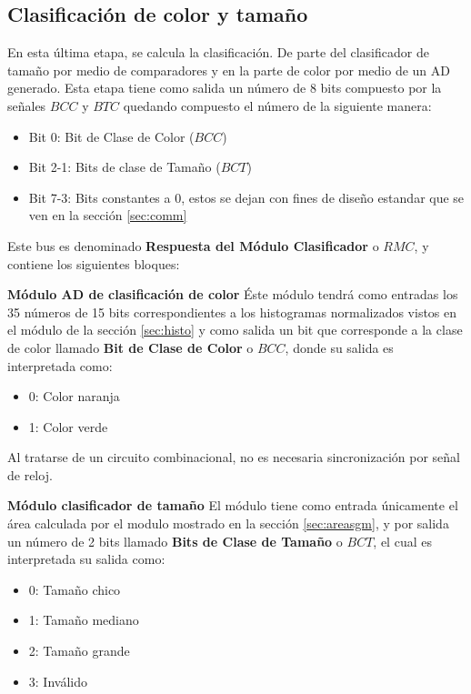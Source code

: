 \documentclass[twoside,spanish,ESP,MSc]{plantillaLabUPV}
\theoremstyle{definition}
\begin{document}
\subsection{Clasificación de color y tamaño}
En esta última etapa, se calcula la clasificación. De parte del clasificador de tamaño por medio de comparadores y en la parte de color por medio de un AD generado. Esta etapa tiene como salida un número de 8 bits compuesto por la señales $BCC$ y $BTC$ %
quedando compuesto el número de la siguiente manera:

\begin{itemize}[noitemsep]
	\item Bit 0: Bit de Clase de Color ($BCC$)
	\item Bit 2-1: Bits de clase de Tamaño ($BCT$)
	\item Bit 7-3: Bits constantes a 0, estos se dejan con fines de diseño estandar que se ven en la sección \ref{sec:comm}
\end{itemize}

Este bus es denominado \textbf{Respuesta del Módulo Clasificador} o $RMC$, y contiene los siguientes bloques:%


\checkmark\textbf{Módulo AD de clasificación de color} \label{sec:bcc}
Éste módulo tendrá como entradas los 35 números de 15 bits correspondientes a los histogramas normalizados vistos en el módulo de la sección \ref{sec:histo} y como salida un bit que corresponde a la clase de color llamado \textbf{Bit de Clase de Color} o $BCC$, donde su salida es interpretada como:

\begin{itemize}[noitemsep]
	\item 0: Color naranja
	\item 1: Color verde
\end{itemize}

Al tratarse de un circuito combinacional, no es necesaria sincronización por señal de reloj.


\checkmark\textbf{Módulo clasificador de tamaño} \label{sec:bct}
El módulo tiene como entrada únicamente el área calculada por el modulo mostrado en la sección \ref{sec:areasgm}, y  por salida un número de 2 bits llamado \textbf{Bits de Clase de Tamaño} o $BCT$, el cual es interpretada su salida como:

\begin{itemize}[noitemsep]
	\item 0: Tamaño chico
	\item 1: Tamaño mediano
	\item 2: Tamaño grande
	\item 3: Inválido
\end{itemize}
\end{document}
